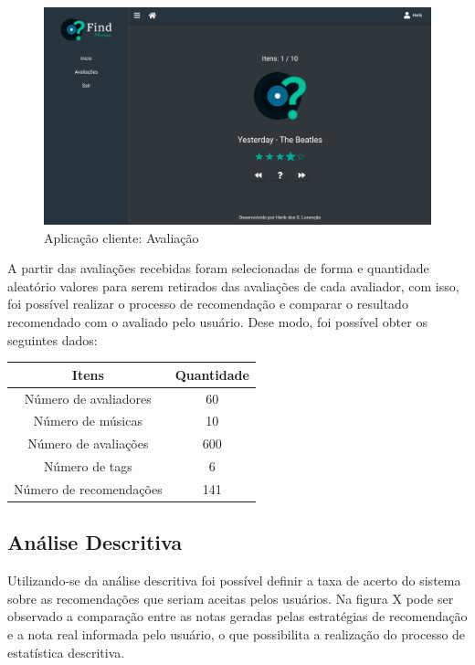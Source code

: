 \begin{figure}[H]
	\centering
	\includegraphics[width=.7\linewidth]{imagens/findmusicAvaliacao.png}
	\caption[Aplicação cliente: Avaliação]{Aplicação cliente: Avaliação}
    \label{fig:findmusicAvaliacao}
\end{figure}

A partir das avaliações recebidas foram selecionadas de forma e quantidade aleatório valores para serem retirados das avaliações de cada avaliador, com isso, foi possível realizar o processo de recomendação e comparar o resultado recomendado com o avaliado pelo usuário. Dese modo, foi possível obter os seguintes dados:

\begin{table}[H]
\centering
\begin{tabular}{|c|c|}
\hline
\textbf{Itens}          & \textbf{Quantidade} \\ \hline
Número de avaliadores   & 60                  \\ \hline
Número de músicas       & 10                  \\ \hline
Número de avaliações    & 600                 \\ \hline
Número de tags          & 6                   \\ \hline
Número de recomendações & 141                  \\ \hline
\end{tabular}
\label{table:resultadosEstudoCasoEdu} 
\end{table}

\subsection{Análise Descritiva}

Utilizando-se da análise descritiva foi possível definir a taxa de acerto do sistema sobre as recomendações que seriam aceitas pelos usuários. Na figura X pode ser observado a comparação entre as notas geradas pelas estratégias de recomendação e a nota real informada pelo usuário, o que possibilita a realização do processo de estatística descritiva.

